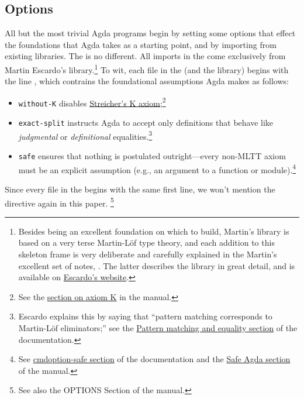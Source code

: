 \documentclass[a4paper,USenglish,cleveref,autoref,thm-restate]{lipics-v2019}
\begin{document}
\subsection{Options}\label{options}
All but the most trivial Agda programs begin by setting some options that effect the foundations that Agda takes as a starting point, and by importing from existing libraries. The \agdaualib is no different. All imports in the \agdaualib come exclusively from Martin Escardo's \typetopology library.\footnote{Besides being an excellent foundation on which to build, Martin's library is based on a very terse Martin-L\"of type theory, and each addition to this skeleton frame is very deliberate and carefully explained in the Martin's excellent set of notes, \hottufinagda.  The latter describes the \typetopology library in great detail, and is available on \href{https://www.cs.bham.ac.uk/~mhe/HoTT-UF-in-Agda-Lecture-Notes}{Escardo's website}.} To wit, each file in the \agdaualib (and the \typetopology library) begins with the line \AgdaSymbol{\{-\#}\AgdaSpace{}\AgdaSpace{}\AgdaSpace{}\AgdaSpace{}\AgdaSpace{}\AgdaSymbol{\#-\}}, 
which contrains the foundational assumptions Agda makes as follows:
\begin{itemize}
\item \texttt{without-K} disables \href{https://ncatlab.org/nlab/show/axiom+K+\%28type+theory\%29}{Streicher's K axiom};\footnote{See the \href{https://agda.readthedocs.io/en/v2.6.1/language/without-k.html}{section on axiom K} in the \agdalangref manual.}
\item \texttt{exact-split} instructs Agda to accept only definitions that behave like \emph{judgmental} or \emph{definitional} equalities.\footnote{Escardo explains this by saying that ``pattern matching corresponds to Martin-Löf eliminators;'' see the \href{https://agda.readthedocs.io/en/v2.6.1/tools/command-line-options.html\#pattern-matching-and-equality}{Pattern matching and equality section} of the \agdatools documentation.}
\item \texttt{safe} ensures that nothing is postulated outright---every non-MLTT axiom must be an explicit assumption (e.g., an argument to a function or module).\footnote{See \href{https://agda.readthedocs.io/en/v2.6.1/tools/command-line-options.html\#cmdoption-safe}{cmdoption-safe section} of the \agdatools documentation and the \href{https://agda.readthedocs.io/en/v2.6.1/language/safe-agda.html\#safe-agda}{Safe Agda section} of the \agdalangref manual.}
\end{itemize}
Since every file in the \agdaualib begins with the same first line, we won't mention the  directive again in this paper.%
\footnote{See also the OPTIONS Section of the \agdalangref manual.}
\end{document}
